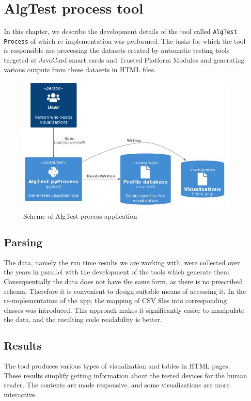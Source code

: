 \chapter{AlgTest process tool}
In this chapter, we describe the development details of the tool called \texttt{AlgTest Process} of which re-implementation was performed. The tasks for which the tool is responsible are processing the datasets created by automatic testing tools targeted at JavaCard smart cards and Trusted Platform Modules and generating various outputs from these datasets in HTML files.

\begin{figure}[h]
    \centering
    \includegraphics[width=\textwidth]{img/scheme.png}
    \caption{Scheme of AlgTest process application}
    \label{fig:algtest-process-scheme}
\end{figure}


\section{Parsing}
The data, namely the run time results we are working with, were collected over the years in parallel with the development of the tools which generate them. Consequentially the data does not have the same form, as there is no prescribed schema. Therefore it is convenient to design suitable means of accessing it. In the re-implementation of the app, the mapping of CSV files into corresponding classes was introduced. This approach makes it significantly easier to manipulate the data, and the resulting code readability is better.

\section{Results}
The tool produces various types of visualization and tables in HTML pages. These results simplify getting information about the tested devices for the human reader. The contents are made responsive, and some visualizations are more interactive.

